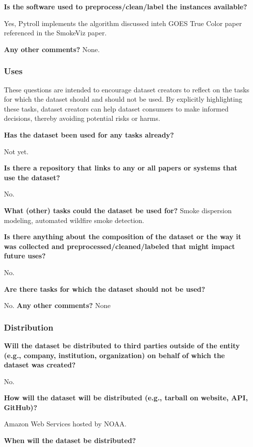 \documentclass{article}
\begin{document}
\textbf{Is the software used to preprocess/clean/label the instances available?}


Yes, Pytroll implements the algorithm discussed inteh GOES True Color paper referenced in the SmokeViz paper.

\textbf{Any other comments?}
None.

\subsubsection{Uses}

These questions are intended to encourage dataset creators to reflect on the tasks for which the dataset should and should not be used. By explicitly highlighting these tasks, dataset creators can help dataset consumers to make informed decisions, thereby avoiding potential risks or harms.

\textbf{Has the dataset been used for any tasks already?}

Not yet.

\textbf{Is there a repository that links to any or all papers or systems that use the dataset?}

No.

\textbf{What (other) tasks could the dataset be used for?}
Smoke dispersion modeling, automated wildfire smoke detection. 

\textbf{Is there anything about the composition of the dataset or the way it was collected and preprocessed/cleaned/labeled that might impact future uses?}

No.

\textbf{Are there tasks for which the dataset should not be used?}

No.
\textbf{Any other comments?}
None

\subsubsection{Distribution}

\textbf{Will the dataset be distributed to third parties outside of the entity (e.g., company, institution, organization) on behalf of which the dataset was created? }

No.

\textbf{How will the dataset will be distributed (e.g., tarball on website, API, GitHub)?}

Amazon Web Services hosted by NOAA.

\textbf{When will the dataset be distributed?}
\end{document}
